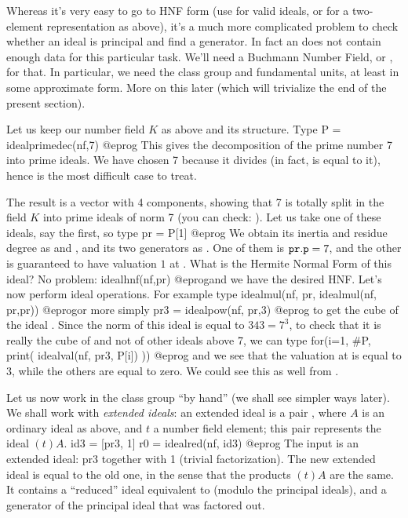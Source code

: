Whereas it's very easy to go to HNF form (use  for valid
ideals, or  for a two-element representation as above),
it's a much more complicated problem to check whether an ideal is principal
and find a generator. In fact an  does not contain enough data for
this particular task. We'll need a Buchmann Number Field, or , for
that. In particular, we need the class group and fundamental units, at least
in some approximate form. More on this later (which will trivialize the end
of the present section).\smallskip

Let us keep our number field $K$ as above and its  structure. Type
\bprog
  P = idealprimedec(nf,7)
@eprog\noindent
This gives the decomposition of the prime number 7 into prime ideals. We have
chosen 7 because it divides  (in fact, is equal to it), hence
is the most difficult case to treat.

The result is a vector with 4 components, showing that 7 is totally split in
the field $K$ into prime ideals of norm 7 (you can check:
). Let us take one of these ideals, say the first, so
type
\bprog
  pr = P[1]
@eprog
We obtain its inertia and residue degree as 
and , and its two generators as . One of them is
${\tt pr.p} = 7$, and the other is guaranteed to have valuation $1$ at
. What is the Hermite Normal Form of this ideal? No problem:
\bprog
  idealhnf(nf,pr)
@eprog\noindent and we have the desired HNF. Let's now perform ideal
operations. For example type
\bprog
  idealmul(nf, pr, idealmul(nf, pr,pr))
@eprog\noindent or more simply
\bprog
  pr3 = idealpow(nf, pr,3)
@eprog\noindent
to get the cube of the ideal . Since the norm of this ideal is equal
to $343=7^3$, to check that it is really the cube of  and not of
other ideals above 7, we can type
\bprog
  for(i=1, #P, print( idealval(nf, pr3, P[i]) ))
@eprog\noindent
and we see that the valuation at  is equal to 3, while the others are
equal to zero. We could see this as well from .

Let us now work in the class group ``by hand'' (we shall see simpler ways
later). We shall work with \emph{extended ideals}: an extended ideal is a pair
\kbd{[A, t]}, where $A$ is an ordinary ideal as above, and $t$ a number field
element; this pair represents the ideal $(t) A$.
\bprog
  id3 = [pr3, 1]
  r0 = idealred(nf, id3)
@eprog\noindent
The input  is an extended ideal: pr3 together with 1 (trivial
factorization). The new extended ideal  is equal to the old one,
in the sense that the products $(t)A$ are the same. It contains a ``reduced''
ideal equivalent to  (modulo the principal ideals), and a generator
of the principal ideal that was factored out.

